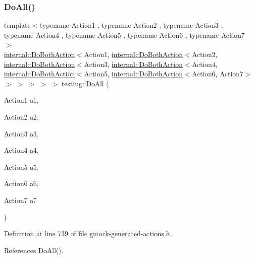 \subsubsection{\texorpdfstring{Do\+All()}{DoAll()}\hspace{0.1cm}{\footnotesize\ttfamily [6/9]}}
{\footnotesize\ttfamily template$<$typename Action1 , typename Action2 , typename Action3 , typename Action4 , typename Action5 , typename Action6 , typename Action7 $>$ \\
\hyperlink{classtesting_1_1internal_1_1DoBothAction}{internal\+::\+Do\+Both\+Action}$<$Action1, \hyperlink{classtesting_1_1internal_1_1DoBothAction}{internal\+::\+Do\+Both\+Action}$<$Action2, \hyperlink{classtesting_1_1internal_1_1DoBothAction}{internal\+::\+Do\+Both\+Action}$<$Action3, \hyperlink{classtesting_1_1internal_1_1DoBothAction}{internal\+::\+Do\+Both\+Action}$<$Action4, \hyperlink{classtesting_1_1internal_1_1DoBothAction}{internal\+::\+Do\+Both\+Action}$<$Action5, \hyperlink{classtesting_1_1internal_1_1DoBothAction}{internal\+::\+Do\+Both\+Action}$<$Action6, Action7$>$ $>$ $>$ $>$ $>$ $>$ testing\+::\+Do\+All (\begin{DoxyParamCaption}\item[{Action1}]{a1,  }\item[{Action2}]{a2,  }\item[{Action3}]{a3,  }\item[{Action4}]{a4,  }\item[{Action5}]{a5,  }\item[{Action6}]{a6,  }\item[{Action7}]{a7 }\end{DoxyParamCaption})\hspace{0.3cm}{\ttfamily [inline]}}



Definition at line 739 of file gmock-\/generated-\/actions.\+h.



References Do\+All().


